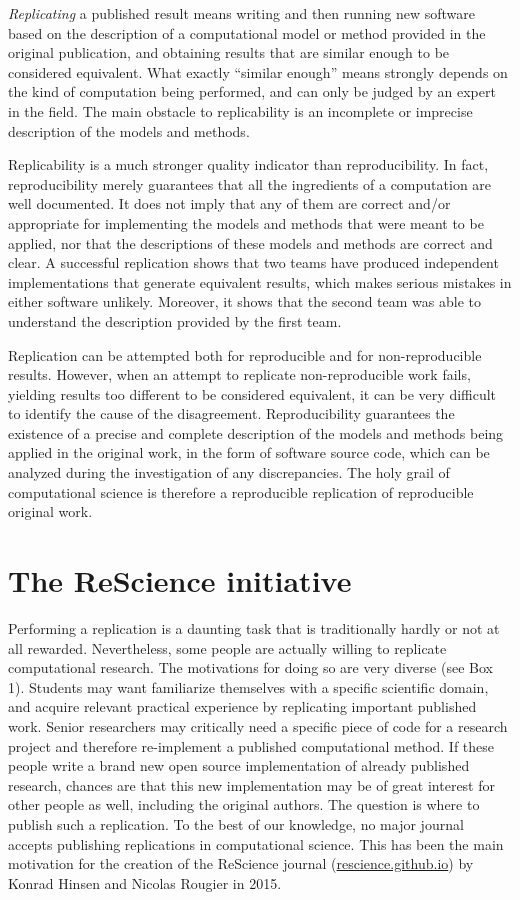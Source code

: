 \documentclass[a4paper,10pt, twocolumn]{article}
\begin{document}
\textit{Replicating} a published result means writing and then running
new software based on the description of a computational model or
method provided in the original publication, and obtaining results
that are similar enough to be considered equivalent. What exactly
``similar enough'' means strongly depends on the kind of computation
being performed, and can only be judged by an expert in the field.
The main obstacle to replicability is an incomplete or imprecise
description of the models and methods.

Replicability is a much stronger quality indicator than
reproducibility. In fact, reproducibility merely guarantees that all
the ingredients of a computation are well documented. It does not
imply that any of them are correct and/or appropriate for implementing
the models and methods that were meant to be applied, nor that the
descriptions of these models and methods are correct and clear. A
successful replication shows that two teams have produced independent
implementations that generate equivalent results, which makes serious
mistakes in either software unlikely. Moreover, it shows that the
second team was able to understand the description provided by the
first team.

Replication can be attempted both for reproducible and for
non-reproducible results. However, when an attempt to replicate
non-reproducible work fails, yielding results too different to be
considered equivalent, it can be very difficult to identify the cause
of the disagreement. Reproducibility guarantees the existence of a
precise and complete description of the models and methods being
applied in the original work, in the form of software source code,
which can be analyzed during the investigation of any
discrepancies. The holy grail of computational science is therefore a
reproducible replication of reproducible original work.

\section*{The ReScience initiative}

Performing a replication is a daunting task that is traditionally hardly or not
at all rewarded. Nevertheless, some people are actually willing to replicate
computational research. The motivations for doing so are very diverse (see Box 1). Students may want familiarize themselves with
a specific scientific domain, and acquire relevant practical experience by replicating important published work. Senior researchers may critically
need a specific piece of code for a research project and therefore re-implement a published computational method. If these people write a brand new
open source implementation of already published research, chances are that this new
implementation may be of great interest for other people as well, including
the original authors. The question is where to publish such a replication. To the
best of our knowledge, no major journal accepts publishing replications in computational science. This has been the main motivation for the
creation of the ReScience journal (\url{rescience.github.io}) by Konrad Hinsen
and Nicolas Rougier in 2015.\\
\end{document}
